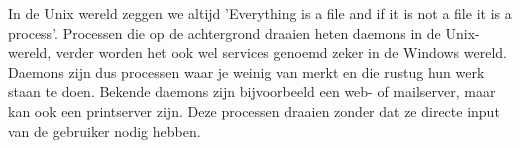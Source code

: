In de Unix wereld zeggen we altijd 'Everything is a file and if it is not a file it is a process'. Processen die op de achtergrond draaien heten daemons in de Unix-wereld, verder worden het ook wel services genoemd zeker in de Windows wereld. Daemons zijn dus processen waar je weinig van merkt en die rustug hun werk staan te doen. Bekende daemons zijn bijvoorbeeld een web- of mailserver, maar kan ook een printserver zijn. Deze processen draaien zonder dat ze directe input van de gebruiker nodig hebben.
